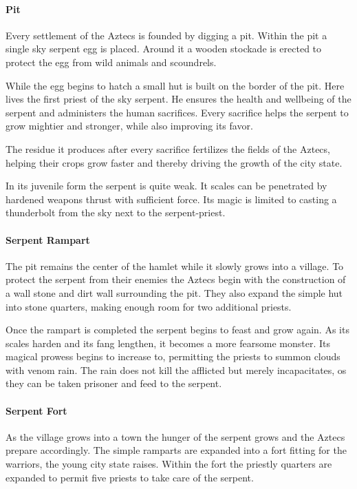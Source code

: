 \documentclass[a4paper]{book}
\begin{document}
			\paragraph{Pit}
				Every settlement of the \gls{Aztecs} is founded by digging a pit.
				Within the pit a single sky serpent egg is placed.
				Around it a wooden stockade is erected to protect the egg from
				wild animals and scoundrels.

				While the egg begins to hatch a small hut is built on the border of the pit.
				Here lives the first priest of the sky serpent.
				He ensures the health and wellbeing of the serpent and administers the human sacrifices.
				Every sacrifice helps the serpent to grow mightier and stronger,
				while also improving its favor.

				The residue it produces after every sacrifice fertilizes the fields of the \gls{Aztecs},
				helping their crops grow faster and thereby driving the growth of the city state.

				In its juvenile form the serpent is quite weak.
				It scales can be penetrated by hardened weapons thrust with sufficient force.
				Its magic is limited to casting a thunderbolt from the sky next
				to the serpent-priest.

			\paragraph{Serpent Rampart}
				The pit remains the center of the hamlet while it slowly grows into a village.
				To protect the serpent from their enemies the \gls{Aztecs}
				begin with the construction of a wall stone and dirt wall surrounding the pit.
				They also expand the simple hut into stone quarters, making enough room
				for two additional priests.

				Once the rampart is completed the serpent begins to feast and grow again.
				As its scales harden and its fang lengthen, it becomes a more fearsome monster.
				Its magical prowess begins to increase to,
				permitting the priests to summon clouds with venom rain.
				The rain does not kill the afflicted but merely incapacitates,
				os they can be taken prisoner and feed to the serpent.

			\paragraph{Serpent Fort}
				As the village grows into a town the hunger of the serpent grows and the \gls{Aztecs} 
				prepare accordingly.
				The simple ramparts are expanded into a fort fitting for the warriors,
				the young city state raises.
				Within the fort the priestly quarters are expanded to permit five priests
				to take care of the serpent.
\end{document}
